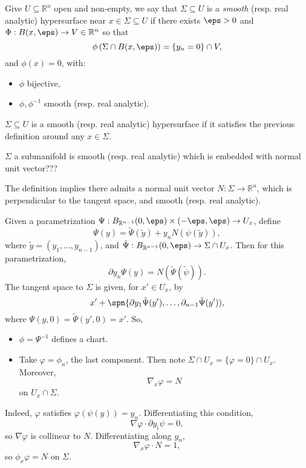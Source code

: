 \documentclass[12pt]{article}
\begin{document}
\begin{definition}
	Give $U \subseteq \mathbb{R}^n$ open and non-empty, we say that $\Sigma \subseteq U$ is a \emph{smooth} (resp. real analytic) hypersurface near $x \in \Sigma \subseteq U$ if there exists $\eps > 0$ and $\Phi : B(x, \eps) \to V \in \mathbb{R}^n$ so that
	\[
		\phi\left( \Sigma \cap B(x, \eps) \right) = \{y_n = 0\} \cap V,
	\]
	and $\phi(x) = 0$, with:
	\begin{itemize}
		\item $\phi$ bijective,
		\item $\phi, \phi^{-1}$ smooth (resp. real analytic).
	\end{itemize}
	$\Sigma \subseteq U$ is a smooth (resp. real analytic) hypersurface if it satisfies the previous definition around any $x \in \Sigma$.
\end{definition}

\begin{remark}
	$\Sigma$ a submanifold is smooth (resp. real analytic) which is embedded with normal unit vector???
\end{remark}

The definition implies there admits a normal unit vector $N : \Sigma \to \mathbb{R}^n$, which is perpendicular to the tangent space, and smooth (resp. real analytic).

Given a parametrization $\Psi : B_{\mathbb{R}^{n-1}}(0, \eps) \times (-\eps, \eps) \to U_x$, define
\[
\Psi(y) = \tilde \Psi(\tilde y) + y_n N(\psi(\tilde y)),
\]
where $\tilde y = (y_1, \ldots, y_{n-1})$, and $\tilde \Psi : B_{\mathbb{R}^{n-1}}(0, \eps) \to \Sigma \cap U_x$. Then for this parametrization,
\[
\partial y_n \Psi(y) = N(\tilde \Psi(\tilde \psi)).
\]
The tangent space to $\Sigma$ is given, for $x' \in U_x$, by
\[
x' + \spn \{ \partial y_1 \tilde \Psi(y'), \ldots, \partial_{n-1} \tilde \Psi(y')),
\]
where $\Psi(y, 0) = \tilde \Psi(y', 0) = x'$. So,
\begin{itemize}
	\item $\phi = \Psi^{-1}$ defines a chart.
	\item Take $\varphi = \phi_n$, the last component. Then note $\Sigma \cap U_x = \{\varphi = 0\} \cap U_x$. Moreover,
		\[
		\nabla_x \varphi = N
		\]
		on $U_x \cap \Sigma$.
\end{itemize}

Indeed, $\varphi$ satisfies $\varphi(\psi(y)) = y_n$. Differentiating this condition,
\[
\nabla \varphi \cdot \partial y_i \psi = 0,
\]
so $\nabla \varphi$ is collinear to $N$. Differentiating along $y_n$,
\[
\nabla_x \varphi \cdot N = 1,
\]
so $\phi_x \varphi = N$ on $\Sigma$.
\end{document}
